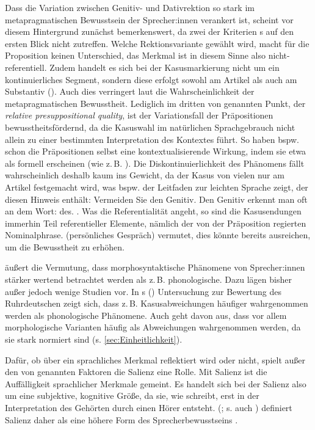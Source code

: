 Dass die Variation zwischen Genitiv- und Dativrektion so stark im metapragmatischen Bewusstsein der Sprecher:innen verankert ist, scheint vor diesem Hintergrund zunächst bemerkenswert, da zwei der Kriterien \citeauthor{Silverstein.1976}s auf den ersten Blick nicht zutreffen. 
Welche Rektionsvariante gewählt wird, macht für die Proposition keinen Unterschied, das Merkmal ist in diesem Sinne also nicht-referentiell. 
Zudem handelt es sich bei der Kasusmarkierung nicht um ein kontinuierliches Segment, sondern diese erfolgt sowohl am Artikel als auch am Substantiv (). 
Auch dies verringert laut \citet{Silverstein.1981} die Wahrscheinlichkeit der metapragmatischen Bewusstheit. 
Lediglich im dritten von \citet{Silverstein.1981} genannten Punkt, der \textit{relative presuppositional quality}, ist der Variationsfall der Präpositionen bewusstheitsf{\"o}rdernd, da die Kasuswahl im nat{\"u}rlichen Sprachgebrauch nicht allein zu einer bestimmten Interpretation des Kontextes führt. 
So haben bspw. schon die Pr{\"a}positionen selbst eine kontextualisierende Wirkung, indem sie etwa als formell erscheinen (wie z.\,B. ). 
Die Diskontinuierlichkeit des Phänomens fällt wahrscheinlich deshalb kaum ins Gewicht, da der Kasus von vielen nur am Artikel festgemacht wird, was bspw. der Leitfaden zur leichten Sprache zeigt, der diesen Hinweis enthält: \glqq Vermeiden Sie den Genitiv. 
Den Genitiv erkennt man oft an dem Wort: des.\grqq{} \citep[30]{BMAS.2017}. 
Was die Referentialität angeht, so sind die Kasusendungen immerhin Teil referentieller Elemente, nämlich der von der Präposition regierten Nominalphrase. 
\citeauthor{Silverstein.1981} (persönliches Gespräch) vermutet, dies könnte bereits ausreichen, um die Bewusstheit zu erhöhen.

\citet{Hettler.2013} {\"a}u{\ss}ert die Vermutung, dass morphosyntaktische Ph{\"a}nomene von Sprecher:innen st{\"a}rker wertend betrachtet werden als z.\,B. phonologische. 
Dazu lägen bisher außer \citet{Mihm.1985} jedoch wenige Studien vor. 
In \citeauthor{Mihm.1985}s (\citeyear{Mihm.1985}) Untersuchung zur Bewertung des Ruhrdeutschen zeigt sich, dass z.\,B. Kasusabweichungen h{\"a}ufiger wahrgenommen werden als phonologische Ph{\"a}nomene. 
Auch \citet[522]{Harnisch.2005} geht davon aus, dass vor allem morphologische Varianten häufig als Abweichungen wahrgenommen werden, da sie stark normiert sind (s. \autoref{sec:Einheitlichkeit}). 

Dafür, ob über ein sprachliches Merkmal reflektiert wird oder nicht, spielt außer den von \citet{Silverstein.1981} genannten Faktoren die Salienz eine Rolle. 
Mit Salienz ist die Auffälligkeit sprachlicher Merkmale gemeint. 
Es handelt sich bei der Salienz also um eine subjektive, kognitive Größe, da sie, wie \citet[33]{Purschke2014} schreibt, {\glqq}erst in der Interpretation des Gehörten durch einen Hörer entsteht{\grqq}. 
\citeauthor{Lenz2010} (\citeyear{Lenz.2003}; s. auch \citeyear[94]{Lenz2010}) definiert Salienz daher als 
{\glqq}eine h{\"o}here Form des Sprecherbewusstseins{\grqq} \citep[200]{Lenz.2003}.


